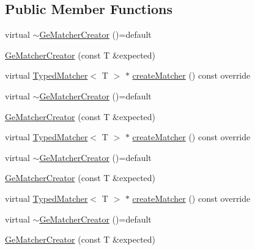 \subsection*{Public Member Functions}
\begin{DoxyCompactItemize}
\item 
virtual \mbox{\hyperlink{structfakeit_1_1internal_1_1GeMatcherCreator_aede79743afe7c3709b869d12a81538f2}{$\sim$\+Ge\+Matcher\+Creator}} ()=default
\item 
\mbox{\hyperlink{structfakeit_1_1internal_1_1GeMatcherCreator_a71dea5672e8e0df897ed4a4f12e266ce}{Ge\+Matcher\+Creator}} (const T \&expected)
\item 
virtual \mbox{\hyperlink{structfakeit_1_1TypedMatcher}{Typed\+Matcher}}$<$ T $>$ $\ast$ \mbox{\hyperlink{structfakeit_1_1internal_1_1GeMatcherCreator_abdd98f20fef3c4eae426d4f6e31e24b2}{create\+Matcher}} () const override
\item 
virtual \mbox{\hyperlink{structfakeit_1_1internal_1_1GeMatcherCreator_aede79743afe7c3709b869d12a81538f2}{$\sim$\+Ge\+Matcher\+Creator}} ()=default
\item 
\mbox{\hyperlink{structfakeit_1_1internal_1_1GeMatcherCreator_a71dea5672e8e0df897ed4a4f12e266ce}{Ge\+Matcher\+Creator}} (const T \&expected)
\item 
virtual \mbox{\hyperlink{structfakeit_1_1TypedMatcher}{Typed\+Matcher}}$<$ T $>$ $\ast$ \mbox{\hyperlink{structfakeit_1_1internal_1_1GeMatcherCreator_abdd98f20fef3c4eae426d4f6e31e24b2}{create\+Matcher}} () const override
\item 
virtual \mbox{\hyperlink{structfakeit_1_1internal_1_1GeMatcherCreator_aede79743afe7c3709b869d12a81538f2}{$\sim$\+Ge\+Matcher\+Creator}} ()=default
\item 
\mbox{\hyperlink{structfakeit_1_1internal_1_1GeMatcherCreator_a71dea5672e8e0df897ed4a4f12e266ce}{Ge\+Matcher\+Creator}} (const T \&expected)
\item 
virtual \mbox{\hyperlink{structfakeit_1_1TypedMatcher}{Typed\+Matcher}}$<$ T $>$ $\ast$ \mbox{\hyperlink{structfakeit_1_1internal_1_1GeMatcherCreator_abdd98f20fef3c4eae426d4f6e31e24b2}{create\+Matcher}} () const override
\item 
virtual \mbox{\hyperlink{structfakeit_1_1internal_1_1GeMatcherCreator_aede79743afe7c3709b869d12a81538f2}{$\sim$\+Ge\+Matcher\+Creator}} ()=default
\item 
\mbox{\hyperlink{structfakeit_1_1internal_1_1GeMatcherCreator_a71dea5672e8e0df897ed4a4f12e266ce}{Ge\+Matcher\+Creator}} (const T \&expected)
\item 

\end{DoxyCompactItemize}
